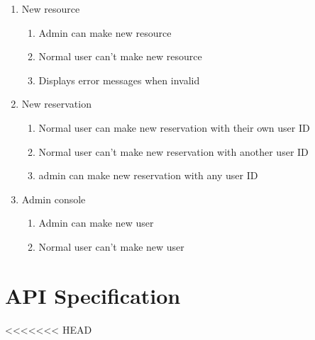\documentclass[12pt]{article}
\begin{document}
\begin{enumerate}
\begin{enumerate}
	\end{enumerate}
	\item New resource
	\begin{enumerate}
		\item Admin can make new resource
		\item Normal user can't make new resource
		\item Displays error messages when invalid
	\end{enumerate}
	\item New reservation
	\begin{enumerate}
		\item Normal user can make new reservation with their own user ID
		\item Normal user can't make new reservation with another user ID
		\item admin can make new reservation with any user ID
	\end{enumerate}
	\item Admin console
	\begin{enumerate}
		\item Admin can make new user
		\item Normal user can't make new user
	\end{enumerate}
\end{enumerate}

\clearpage
\section{API Specification}
\label{appendix:apispec}
<<<<<<< HEAD
\end{document}
